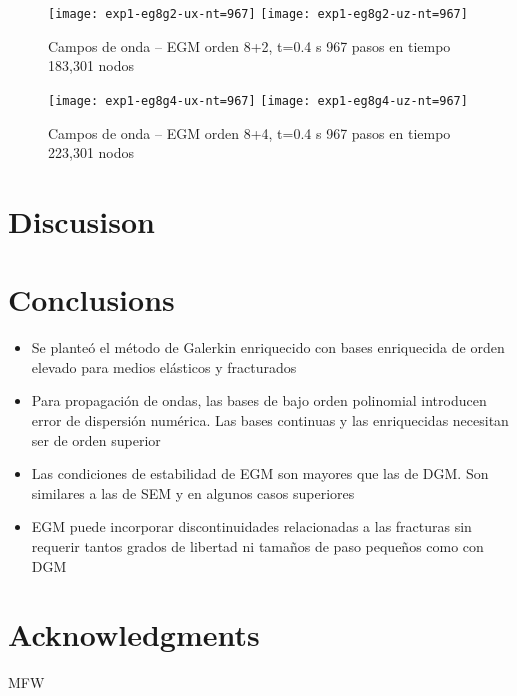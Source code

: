 \documentclass[review,hidelinks,onefignum,onetabnum]{siamart220329}
\newcommand{\tw}{\textwidth}
\begin{document}
\begin{figure}
\texttt{[image: exp1-eg8g2-ux-nt=967]}
\texttt{[image: exp1-eg8g2-uz-nt=967]}
\caption{Campos de onda -- EGM orden 8+2, t=0.4 s \textbullet{} 967 pasos en tiempo \textbullet{} 183,301 nodos}
\end{figure} 

\begin{figure}
\texttt{[image: exp1-eg8g4-ux-nt=967]}
\texttt{[image: exp1-eg8g4-uz-nt=967]}
\caption{Campos de onda -- EGM orden 8+4, t=0.4 s \textbullet{} 967 pasos en tiempo \textbullet{} 223,301 nodos}
\end{figure} 

\section{Discusison}

\section{Conclusions}

\begin{itemize}
\item
Se plante\'o el m\'etodo de Galerkin enriquecido con bases enriquecida de orden elevado para medios el\'asticos y fracturados


\item
Para propagaci\'on de ondas, las bases de bajo orden polinomial introducen error de dispersi\'on num\'erica. Las bases continuas y las enriquecidas necesitan ser de orden superior


\item
Las condiciones de estabilidad de EGM son mayores que las de DGM. Son similares a las de SEM y en algunos casos superiores


\item
EGM puede incorporar discontinuidades relacionadas a las fracturas sin requerir tantos grados de libertad ni tama\~nos de paso peque\~nos como con DGM

\end{itemize}

\section*{Acknowledgments}
MFW



\end{document}
